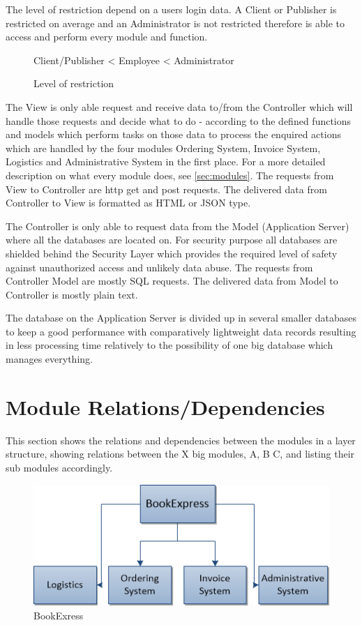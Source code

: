 \documentclass[11pt,a4paper,oneside,svgnames]{report}
\begin{document}
The level of restriction depend on a users login data. A Client or Publisher is restricted on average and an Administrator is not restricted therefore is able to access and perform every module and function.
\\
\begin{figure}[H]
\begin{center}
Client/Publisher < Employee < Administrator
\end{center}
\caption{Level of restriction}
\end{figure}

The View is only able request and receive data to/from the Controller which will handle those requests and decide what to do - according to the defined functions and models which perform tasks on those data to process the enquired actions which are handled by the four modules Ordering System, Invoice System, Logistics and Administrative System in the first place. For a more detailed description on what every module does, see \ref{sec:modules}. The requests from View to Controller are http get and post requests. The delivered data from Controller to View is formatted as HTML or JSON type.

The Controller is only able to request data from the Model (Application Server) where all the databases are located on. For security purpose all databases are shielded behind the Security Layer which provides the required level of safety against unauthorized access and unlikely data abuse. The requests from Controller Model are mostly SQL requests. The delivered data from Model to Controller is mostly plain text.

The database on the Application Server is divided up in several smaller databases to keep a good performance with comparatively lightweight data records resulting in less processing time relatively to the possibility of one big database which manages everything.


\section{Module Relations/Dependencies}
This section shows the relations and dependencies between the modules in a layer structure, showing relations between the X big modules, A, B C, and listing their sub modules accordingly.

\begin{figure}[H]
 \begin{center}
  \includegraphics[width=\textwidth]{BookExpress.png}
 \end{center}
 \caption{BookExress}
\end{figure}
\end{document}
